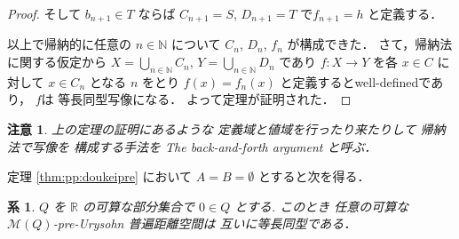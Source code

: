 \documentclass[leqno, 12pt]{jsarticle}
\newtheorem{cor}[thm]{系}
\newtheorem*{rmk}{注意}
\newcommand{\nn}{\mathbb{N}}
\newcommand{\rr}{\mathbb{R}}
\begin{document}
\begin{proof}
そして
$b_{n+1}\in T$
ならば
$C_{n+1}=S$, 
$D_{n+1}=T$
で$f_{n+1}=h$
と定義する．




以上で帰納的に任意の
$n\in \nn$
について
$C_{n}$, 
$D_{n}$, 
$f_{n}$
が構成できた．
さて，帰納法に関する仮定から
$X=\bigcup_{n\in \nn}C_{n}$, 
$Y=\bigcup_{n\in \nn}D_{n}$
であり
$f\colon  X\to  Y$
を各
$x\in C$
に対して
$x\in C_{n}$
となる
$n$
をとり
$f(x)=f_{n}(x)$
と定義するとwell-definedであり，
$f$は
等長同型写像になる．
よって定理が証明された．
\end{proof}
\begin{rmk}
上の定理の証明にあるような
定義域と値域を行ったり来たりして
帰納法で写像を
構成する手法を
The back-and-forth argument
と呼ぶ．
\end{rmk}

定理 \ref{thm:pp:doukeipre}
において
$A=B=\emptyset$
とすると次を得る．
\begin{cor}\label{cor:pp:douekipre}
$Q$
を
$\rr$
の可算な部分集合で
$0\in Q$
とする. 
このとき
任意の可算な
$\mathscr{M}(Q)$-pre-Urysohn
普遍距離空間は
互いに等長同型である．
\end{cor}
\end{document}

